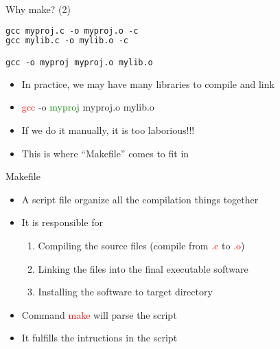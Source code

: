 \begin{frame}[fragile]{Why make? (2)}

\begin{lstlisting}[language=make, linewidth=0.75\linewidth, firstnumber=1,caption="Build the project"]
gcc myproj.c -o myproj.o -c
gcc mylib.c -o mylib.o -c

gcc -o myproj myproj.o mylib.o
\end{lstlisting}
\begin{itemize}
	\item {In practice, we may have many libraries to compile and link}
	\vspace{0.15in}
	\item {\textcolor{red}{gcc} -o \textcolor{green}{myproj} myproj.o mylib.o}
	\vspace{0.15in}
	\item {If we do it manually, it is too laborious!!!}
\end{itemize}

\begin{itemize}
	\item {This is where ``Makefile'' comes to fit in}
\end{itemize}
\end{frame}

\begin{frame}{Makefile}
\begin{itemize}
	\item {A script file organize all the compilation things together}
		\vspace{0.15in}
	\item {It is responsible for}
		\vspace{0.15in}
		\begin{enumerate}
			\item {Compiling the source files (compile from \textcolor{red}{.c} to  \textcolor{red}{.o})}
			\vspace{0.15in}
			\item {Linking the files into the final executable software}
			\vspace{0.15in}
			\item {Installing the software to target directory}
		\end{enumerate}
		\item {Command \textcolor{red}{make} will parse the script}
		\item {It fulfills the intructions in the script}
\end{itemize}
\end{frame}

